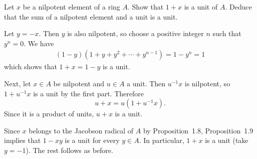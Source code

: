 \begin{exercise}
Let \(x\) be a nilpotent element of a ring \(A\).
Show that \(1 + x\) is a unit of \(A\).
Deduce that the sum of a nilpotent element and a unit is a unit.
\end{exercise}

\begin{solution}
Let \(y = -x\).
Then \(y\) is also nilpotent, so choose a positive integer \(n\) such that \(y^n = 0\).
We have
\begin{align*}
(1 - y) (1 + y + y^2 + \cdots + y^{n-1})
= 1 - y^n
= 1
\end{align*}
which shows that \(1 + x = 1 - y\) is a unit.

Next, let \(x\in A\) be nilpotent and \(u\in A\) a unit.
Then \(u^{-1} x\) is nilpotent, so \(1 + u^{-1}x\) is a unit by the first part.
Therefore
\begin{equation*}
u + x = u(1 + u^{-1} x).
\end{equation*}
Since it is a product of units, \(u + x\) is a unit.
\end{solution}

\begin{altsolution}
Since \(x\) belongs to the Jacobson radical of \(A\) by Proposition~1.8, Proposition~1.9 implies that \(1 - x y\) is a unit for every \(y \in A\).
In particular, \(1 + x\) is a unit (take \(y = -1\)).
The rest follows as before.
\end{altsolution}